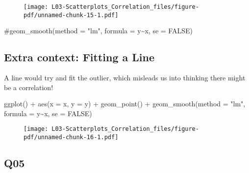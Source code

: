 \documentclass[
  letterpaper,
  DIV=11,
  numbers=noendperiod]{scrreprt}
\newenvironment{Shaded}{\begin{snugshade}}{\end{snugshade}}
\newcommand{\AttributeTok}[1]{\textcolor[rgb]{0.40,0.45,0.13}{#1}}
\newcommand{\CommentTok}[1]{\textcolor[rgb]{0.37,0.37,0.37}{#1}}
\newcommand{\ConstantTok}[1]{\textcolor[rgb]{0.56,0.35,0.01}{#1}}
\newcommand{\FunctionTok}[1]{\textcolor[rgb]{0.28,0.35,0.67}{#1}}
\newcommand{\NormalTok}[1]{\textcolor[rgb]{0.00,0.23,0.31}{#1}}
\newcommand{\SpecialCharTok}[1]{\textcolor[rgb]{0.37,0.37,0.37}{#1}}
\newcommand{\StringTok}[1]{\textcolor[rgb]{0.13,0.47,0.30}{#1}}
\begin{document}
\begin{figure}[H]

{\centering \texttt{[image: L03-Scatterplots\_Correlation\_files/figure-pdf/unnamed-chunk-15-1.pdf]}

}

\end{figure}

\begin{Shaded}
\begin{Highlighting}[]
    \CommentTok{\#geom\_smooth(method = "lm", formula = y\textasciitilde{}x, se = FALSE)}
\end{Highlighting}
\end{Shaded}

\hypertarget{extra-context-fitting-a-line}{%
\subsection{Extra context: Fitting a
Line}\label{extra-context-fitting-a-line}}

\vspace{1cm}

A line would try and fit the outlier, which misleads us into thinking
there might be a correlation!

\begin{Shaded}
\begin{Highlighting}[]
\FunctionTok{ggplot}\NormalTok{() }\SpecialCharTok{+} \FunctionTok{aes}\NormalTok{(}\AttributeTok{x =}\NormalTok{ x, }\AttributeTok{y =}\NormalTok{ y) }\SpecialCharTok{+} \FunctionTok{geom\_point}\NormalTok{() }\SpecialCharTok{+} 
    \FunctionTok{geom\_smooth}\NormalTok{(}\AttributeTok{method =} \StringTok{"lm"}\NormalTok{, }\AttributeTok{formula =}\NormalTok{ y}\SpecialCharTok{\textasciitilde{}}\NormalTok{x, }\AttributeTok{se =} \ConstantTok{FALSE}\NormalTok{)}
\end{Highlighting}
\end{Shaded}

\begin{figure}[H]

{\centering \texttt{[image: L03-Scatterplots\_Correlation\_files/figure-pdf/unnamed-chunk-16-1.pdf]}

}

\end{figure}

\hypertarget{q05}{%
\subsection{Q05}\label{q05}}
\end{document}
